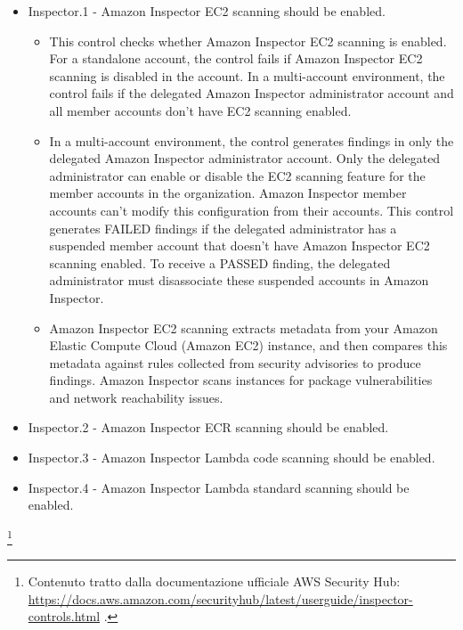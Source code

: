 \begin{mdframed}[backgroundcolor=gray!05, linecolor=gray!50]
\itshape
\begin{itemize}
    \item Inspector.1 - Amazon Inspector EC2 scanning should be enabled.
    \begin{itemize}
        \item This control checks whether Amazon Inspector EC2 scanning is enabled. For a standalone account, the control fails if Amazon Inspector EC2 scanning is disabled in the account. In a multi-account environment, the control fails if the delegated Amazon Inspector administrator account and all member accounts don't have EC2 scanning enabled.
        \item In a multi-account environment, the control generates findings in only the delegated Amazon Inspector administrator account. Only the delegated administrator can enable or disable the EC2 scanning feature for the member accounts in the organization. Amazon Inspector member accounts can't modify this configuration from their accounts. This control generates FAILED findings if the delegated administrator has a suspended member account that doesn't have Amazon Inspector EC2 scanning enabled. To receive a PASSED finding, the delegated administrator must disassociate these suspended accounts in Amazon Inspector.
        \item Amazon Inspector EC2 scanning extracts metadata from your Amazon Elastic Compute Cloud (Amazon EC2) instance, and then compares this metadata against rules collected from security advisories to produce findings. Amazon Inspector scans instances for package vulnerabilities and network reachability issues.
    \end{itemize}

    \item Inspector.2 - Amazon Inspector ECR scanning should be enabled.

    \item Inspector.3 - Amazon Inspector Lambda code scanning should be enabled.

    \item Inspector.4 - Amazon Inspector Lambda standard scanning should be enabled.
\end{itemize}
\end{mdframed}
\footnote{Contenuto tratto dalla documentazione ufficiale AWS Security Hub: \url{https://docs.aws.amazon.com/securityhub/latest/userguide/inspector-controls.html} .}

